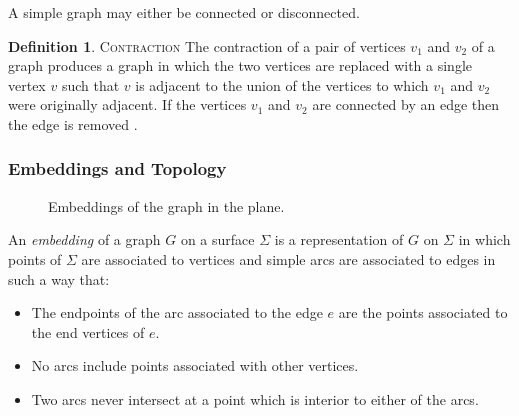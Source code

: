 \documentclass[11pt]{article}
\theoremstyle{definition}
\newtheorem{definition}{Definition}[section]
\begin{document}
	A simple graph may either be connected or disconnected.
	
	\theoremstyle{definition}
	\begin{definition}{\textsc{Contraction}}
		The contraction of a pair of vertices $v_1$ and $v_2$ of a graph produces a graph in which the two vertices are replaced with a single vertex $v$ such that $v$ is adjacent to the union of the vertices to which $v_1$ and $v_2$ were originally adjacent. 
		If the vertices $v_1$ and $v_2$ are connected by an edge then the edge is removed \cite{mathworld:Contraction}.
	\end{definition}
	
\subsubsection{Embeddings and Topology}
    
    \begin{figure}%
		\centering
		\qquad
		\caption[]{Embeddings of the graph in the plane.}%
		\label{fig:embedding}
	\end{figure}
    
    	An \emph{embedding} of a graph $G$ on a surface $\Sigma$ is a representation of $G$ on $\Sigma$ in which points of $\Sigma$ are associated to vertices and simple arcs are associated to edges in such a way that:
  		\begin{itemize}
			\item The endpoints of the arc associated to the edge $e$ are the points associated to the end vertices of $e$.
			\item No arcs include points associated with other vertices.
			\item Two arcs never intersect at a point which is interior to either of the arcs.
  		\end{itemize}
\end{document}
